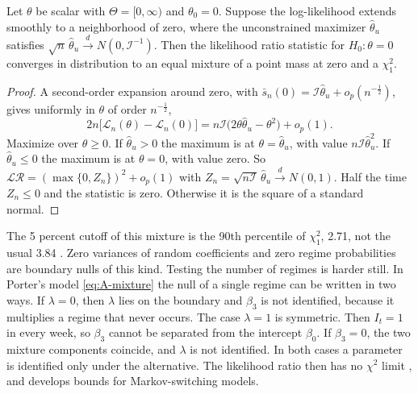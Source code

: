 \begin{proposition}\label{prop:A-boundary}
Let $\theta$ be scalar with $\Theta = [0, \infty)$ and $\theta_0 = 0$. Suppose the log-likelihood extends smoothly to a
neighborhood of zero, where the unconstrained maximizer $\hat\theta_u$ satisfies $\sqrt{n}\,\hat\theta_u \xrightarrow{d}
N(0, \mathcal{I}^{-1})$. Then the likelihood ratio statistic for $H_0: \theta = 0$ converges in distribution to an equal mixture
of a point mass at zero and a $\chi^2_1$.
\end{proposition}

\begin{proof}
A second-order expansion around zero, with $\bar s_n(0) = \mathcal{I}\hat\theta_u + o_p(n^{-\frac{1}{2}})$, gives uniformly in
$\theta$ of order $n^{-\frac{1}{2}}$,
\begin{equation*}
  2n\big[\mathcal{L}_n(\theta) - \mathcal{L}_n(0)\big] = n\mathcal{I}\big(2\theta\hat\theta_u - \theta^2\big) + o_p(1).
\end{equation*}
Maximize over $\theta \ge 0$. If $\hat\theta_u > 0$ the maximum is at $\theta = \hat\theta_u$, with value $n\mathcal{I}\hat\theta_u^2$.
If $\hat\theta_u \le 0$ the maximum is at $\theta = 0$, with value zero. So $\mathcal{LR} = (\max\{0, Z_n\})^2 + o_p(1)$ with
$Z_n = \sqrt{n\mathcal{I}}\,\hat\theta_u \xrightarrow{d} N(0, 1)$. Half the time $Z_n \le 0$ and the statistic is zero. Otherwise it is
the square of a standard normal.
\end{proof}

The 5 percent cutoff of this mixture is the 90th percentile of $\chi^2_1$, 2.71, not the usual 3.84
\citep{Chernoff1954, SelfLiang1987, Andrews2001}. Zero variances of random coefficients and zero regime probabilities are
boundary nulls of this kind. Testing the number of regimes is harder still. In Porter's model \eqref{eq:A-mixture} the
null of a single regime can be written in two ways. If $\lambda = 0$, then $\lambda$ lies on the boundary and $\beta_3$ is
not identified, because it multiplies a regime that never occurs. The case $\lambda = 1$ is symmetric. Then $I_t = 1$ in every
week, so $\beta_3$ cannot be separated from the intercept $\beta_0$. If $\beta_3 = 0$, the two mixture components coincide,
and $\lambda$ is not identified. In both cases a parameter is identified only under the alternative. The likelihood ratio
then has no $\chi^2$ limit \citep{Davies1977}, and \citet{Hansen1992} develops bounds for Markov-switching models.

